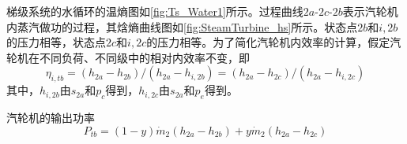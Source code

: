 梯级系统的水循环的温熵图如\autoref{fig:Ts_Water1}所示。过程曲线$2a$-$2c$-$2b$表示汽轮机内蒸汽做功的过程，其焓熵曲线图如\autoref{fig:SteamTurbine_hs}所示。状态点$2b$和$i,2b$的压力相等，状态点$2c$和$i,2c$的压力相等。为了简化汽轮机内效率的计算，假定汽轮机在不同负荷、不同级中的相对内效率不变，即
\begin{equation}
      \eta_{i,tb} =(h_{2a}-h_{2b})/(h_{2a}-h_{i,2b}) = (h_{2a}-h_{2c})/(h_{2a}-h_{i,2c})
\end{equation}
其中，$h_{i,2b}$由$s_{2a}$和$p_c$得到，$h_{i,2c}$由$s_{2a}$和$p_e$得到。

  汽轮机的输出功率
  \begin{equation}
  P_{tb}=\left(1-y\right)\dot{m}_{2}\left(h_{2a}-h_{2b}\right)+y\dot{m}_{2}\left(h_{2a}-h_{2c}\right)
  \end{equation}
 
